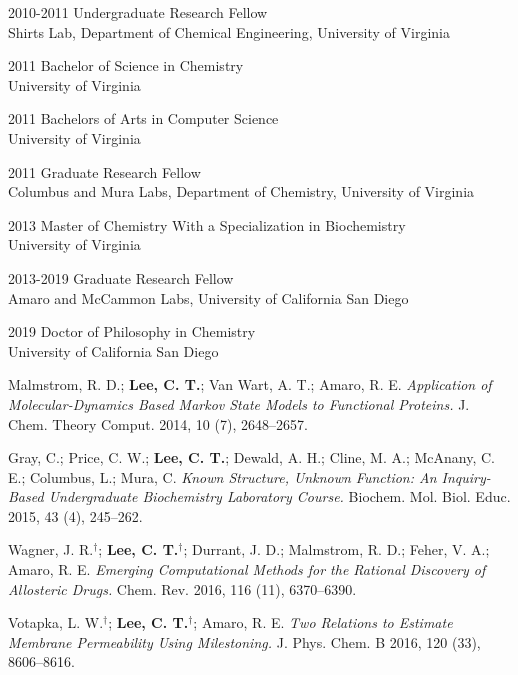 \begin{frontmatter}
%
%
\begin{vitapage}
\begin{vita}
  \item[2010-2011] Undergraduate Research Fellow\\ Shirts Lab, Department of Chemical Engineering, University of Virginia
  \item[2011] Bachelor of Science in Chemistry\\University of Virginia
  \item[2011] Bachelors of Arts in Computer Science\\
  University of Virginia
  \item[2011] Graduate Research Fellow\\
  Columbus and Mura Labs, Department of Chemistry, University of Virginia
  \item[2013] Master of Chemistry With a Specialization in Biochemistry\\ University of Virginia
  \item[2013-2019] Graduate Research Fellow\\ Amaro and McCammon Labs, University of California San Diego
  \item[2019] Doctor of Philosophy in Chemistry\\ University of California San Diego
\end{vita}
\begin{publications}
  \item Malmstrom, R. D.; \textbf{Lee, C. T.}; Van Wart, A. T.; Amaro, R. E. \emph{Application of Molecular-Dynamics Based Markov State Models to Functional Proteins.} J. Chem. Theory Comput. 2014, 10 (7), 2648–2657.
  \item Gray, C.; Price, C. W.; \textbf{Lee, C. T.}; Dewald, A. H.; Cline, M. A.; McAnany, C. E.; Columbus, L.; Mura, C. \emph{Known Structure, Unknown Function: An Inquiry-Based Undergraduate Biochemistry Laboratory Course.} Biochem. Mol. Biol. Educ. 2015, 43 (4), 245–262.
  \item Wagner, J. R.$^{\dagger}$; \textbf{Lee, C. T.$^{\dagger}$}; Durrant, J. D.; Malmstrom, R. D.; Feher, V. A.; Amaro, R. E. \emph{Emerging Computational Methods for the Rational Discovery of Allosteric Drugs.} Chem. Rev. 2016, 116 (11), 6370–6390.
  \item Votapka, L. W.$^{\dagger}$; \textbf{Lee, C. T.$^{\dagger}$}; Amaro, R. E. \emph{Two Relations to Estimate Membrane Permeability Using Milestoning.} J. Phys. Chem. B 2016, 120 (33), 8606–8616.

\end{publications}
\end{vitapage}
\end{frontmatter}
